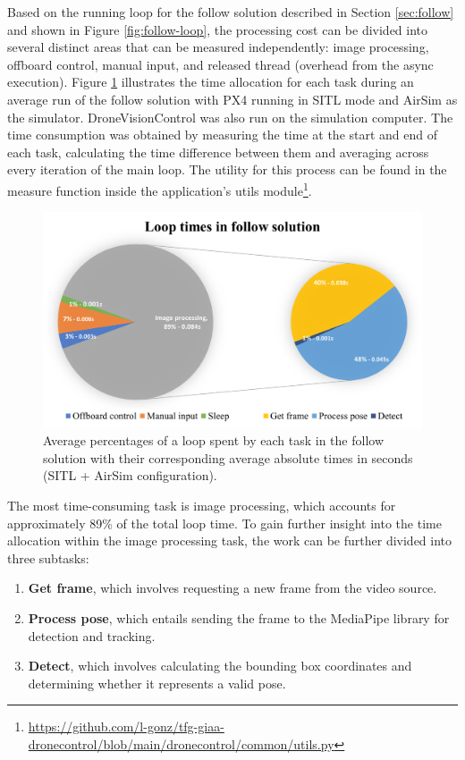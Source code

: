 Based on the running loop for the follow solution described in Section \ref{sec:follow} and shown in Figure \ref{fig:follow-loop}, the processing cost can be divided into several distinct areas that can be measured independently: image processing, offboard control, manual input, and released thread (overhead from the async execution). Figure \ref{fig:perf-sitl-sim} illustrates the time allocation for each task during an average run of the follow solution with PX4 running in SITL mode and AirSim as the simulator. DroneVisionControl was also run on the simulation computer. The time consumption was obtained by measuring the time at the start and end of each task, calculating the time difference between them and averaging across every iteration of the main loop. The utility for this process can be found in the measure function inside the application's utils module\footnote{\url{https://github.com/l-gonz/tfg-giaa-dronecontrol/blob/main/dronecontrol/common/utils.py}}.

\begin{figure}[H]
  \centering
  \includegraphics[width=.9\textwidth, keepaspectratio]{img/sitl-performance.png}
  \caption{Average percentages of a loop spent by each task in the follow solution with their corresponding average absolute times in seconds (SITL + AirSim configuration).}
  \label{fig:perf-sitl-sim}
\end{figure}


The most time-consuming task is image processing, which accounts for approximately 89\% of the total loop time. To gain further insight into the time allocation within the image processing task, the work can be further divided into three subtasks:
\begin{enumerate}
    \item \textbf{Get frame}, which involves requesting a new frame from the video source.
    \item \textbf{Process pose}, which entails sending the frame to the MediaPipe library for detection and tracking.
    \item \textbf{Detect}, which involves calculating the bounding box coordinates and determining whether it represents a valid pose.
\end{enumerate}

